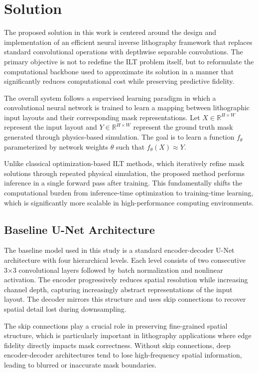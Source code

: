 \documentclass[conference]{IEEEtran}
\begin{document}
\section{\textbf{Solution}}

The proposed solution in this work is centered around the design and implementation of an efficient neural inverse lithography framework that replaces standard convolutional operations with depthwise separable convolutions. The primary objective is not to redefine the ILT problem itself, but to reformulate the computational backbone used to approximate its solution in a manner that significantly reduces computational cost while preserving predictive fidelity.

The overall system follows a supervised learning paradigm in which a convolutional neural network is trained to learn a mapping between lithographic input layouts and their corresponding mask representations. Let \( X \in \mathbb{R}^{H \times W} \) represent the input layout and \( Y \in \mathbb{R}^{H \times W} \) represent the ground truth mask generated through physics-based simulation. The goal is to learn a function \( f_{\theta} \) parameterized by network weights \( \theta \) such that \( f_{\theta}(X) \approx Y \).

Unlike classical optimization-based ILT methods, which iteratively refine mask solutions through repeated physical simulation, the proposed method performs inference in a single forward pass after training. This fundamentally shifts the computational burden from inference-time optimization to training-time learning, which is significantly more scalable in high-performance computing environments.

\subsection{\textbf{Baseline U-Net Architecture}}

The baseline model used in this study is a standard encoder-decoder U-Net architecture with four hierarchical levels. Each level consists of two consecutive 3×3 convolutional layers followed by batch normalization and nonlinear activation. The encoder progressively reduces spatial resolution while increasing channel depth, capturing increasingly abstract representations of the input layout. The decoder mirrors this structure and uses skip connections to recover spatial detail lost during downsampling.

The skip connections play a crucial role in preserving fine-grained spatial structure, which is particularly important in lithography applications where edge fidelity directly impacts mask correctness. Without skip connections, deep encoder-decoder architectures tend to lose high-frequency spatial information, leading to blurred or inaccurate mask boundaries.
\end{document}
